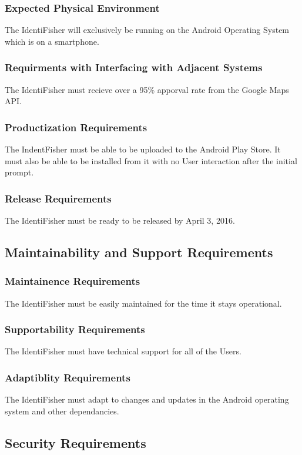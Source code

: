 \documentclass{article}
\begin{document}
\subsubsection{Expected Physical Environment}
The IdentiFisher will exclusively be running on the Android Operating System which is on a smartphone.
\subsubsection{Requirments with Interfacing with Adjacent Systems}
The IdentiFisher must recieve over a 95\% apporval rate from the Google Maps API.
\subsubsection{Productization Requirements}
The IndentFisher must be able to be uploaded to the Android Play Store. It must also be able to be installed
from it with no User interaction after the initial prompt.
\subsubsection{Release Requirements}
The IdentiFisher must be ready to be released by April 3, 2016.

\subsection{Maintainability and Support Requirements}
\subsubsection{Maintainence Requirements}
The IdentiFisher must be easily maintained for the time it stays operational.
\subsubsection{Supportability Requirements}
The IdentiFisher must have technical support for all of the Users.
\subsubsection{Adaptiblity Requirements}
The IdentiFisher must adapt to changes and updates in the Android operating system and other dependancies.

\subsection{Security Requirements}
\end{document}
